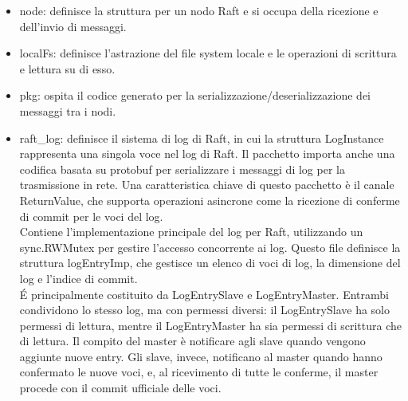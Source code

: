 \begin{itemize}
  \item node: definisce la struttura per un nodo Raft e si occupa della ricezione e dell'invio di messaggi. 

  \item localFs: definisce l'astrazione del file system locale e le operazioni di scrittura e lettura su di esso.

  \item pkg: ospita il codice generato per la serializzazione/deserializzazione dei messaggi tra i nodi.
    
  \item raft\_log: definisce il sistema di log di Raft, in cui la struttura LogInstance rappresenta una singola voce nel log di Raft. Il pacchetto importa anche una codifica basata su protobuf per serializzare i messaggi 
    di log per la trasmissione in rete. Una caratteristica chiave di questo pacchetto è il canale ReturnValue, che supporta operazioni asincrone come la ricezione di conferme di commit per le voci del log. \\
    Contiene l'implementazione principale del log per Raft, utilizzando un sync.RWMutex per gestire l'accesso concorrente ai log. Questo file definisce la struttura logEntryImp, che gestisce un elenco di voci di log, la 
    dimensione del log e l'indice di commit. \\
    \'E principalmente costituito da LogEntrySlave e LogEntryMaster. Entrambi condividono lo stesso log, ma con permessi diversi: il LogEntrySlave ha solo permessi di lettura, mentre il LogEntryMaster ha sia permessi di scrittura 
    che di lettura. Il compito del master è notificare agli slave quando vengono aggiunte nuove entry. Gli slave, invece, notificano al master quando hanno confermato le nuove voci, e, al ricevimento di tutte le conferme, 
    il master procede con il commit ufficiale delle voci.


\end{itemize}

